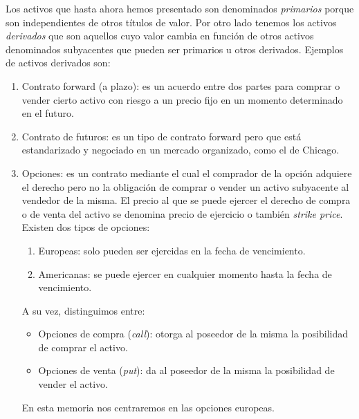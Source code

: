 Los activos que hasta ahora hemos presentado son denominados \textit{primarios} porque son independientes de otros títulos de valor. Por otro lado tenemos los activos \textit{derivados} que son aquellos cuyo valor cambia en función de otros activos denominados subyacentes que pueden ser primarios u otros derivados. Ejemplos de activos derivados son:
\begin{enumerate}
	\item Contrato forward (a plazo): es un acuerdo entre dos partes para comprar o vender cierto activo con riesgo a un precio fijo en un momento determinado en el futuro. 
	\item Contrato de futuros: es un tipo de contrato forward pero que está estandarizado y negociado en un mercado organizado, como el de Chicago.
	\item Opciones: es un contrato mediante el cual el comprador de la opción adquiere el derecho pero no la obligación de comprar o vender un activo subyacente al vendedor de la misma. El precio al que se puede ejercer el derecho de compra o de venta del activo se denomina precio de ejercicio o también \textit{strike price}. Existen dos tipos de opciones: 
	\begin{enumerate}
		\item Europeas: solo pueden ser ejercidas en la fecha de vencimiento.
		\item Americanas:  se puede ejercer en cualquier momento hasta la fecha de vencimiento.
	\end{enumerate}
	A su vez, distinguimos entre:
	\begin{itemize}
		\item Opciones de compra (\textit{call}): otorga al poseedor de la misma la posibilidad de comprar el activo.
		\item Opciones de venta (\textit{put}): da al poseedor de la misma la posibilidad de vender el activo.
	\end{itemize}
	
	En esta memoria nos centraremos en las opciones europeas. 
\end{enumerate} 

